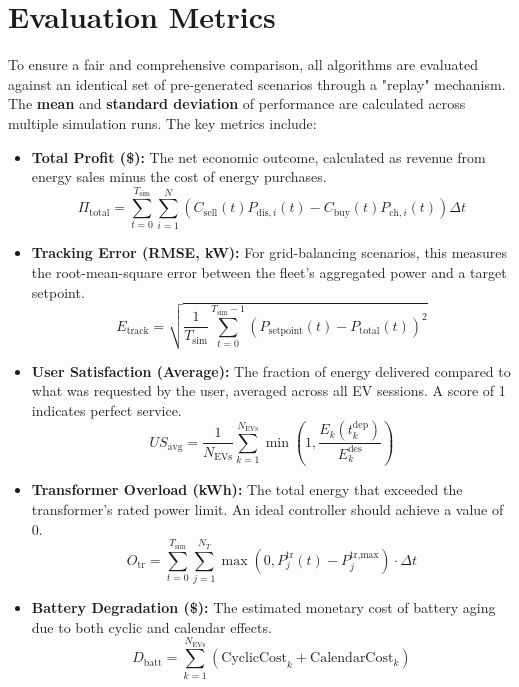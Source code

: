 \section{Evaluation Metrics}
To ensure a fair and comprehensive comparison, all algorithms are evaluated against an identical set of pre-generated scenarios through a "replay" mechanism. The \textbf{mean} and \textbf{standard deviation} of performance are calculated across multiple simulation runs. The key metrics include:

\begin{itemize}
    \item \textbf{Total Profit (\$):} The net economic outcome, calculated as revenue from energy sales minus the cost of energy purchases.
    \[
    \Pi_{\text{total}} = \sum_{t=0}^{T_{\text{sim}}} \sum_{i=1}^{N} \left( C_{\text{sell}}(t) P_{\text{dis},i}(t) - C_{\text{buy}}(t) P_{\text{ch},i}(t) \right) \Delta t
    \]
    
    \item \textbf{Tracking Error (RMSE, kW):} For grid-balancing scenarios, this measures the root-mean-square error between the fleet's aggregated power and a target setpoint.
    \[
    E_{\text{track}} = \sqrt{\frac{1}{T_{\text{sim}}} \sum_{t=0}^{T_{\text{sim}}-1} \left( P_{\text{setpoint}}(t) - P_{\text{total}}(t) \right)^2}
    \]
    
    \item \textbf{User Satisfaction (Average):} The fraction of energy delivered compared to what was requested by the user, averaged across all EV sessions. A score of 1 indicates perfect service.
    \[
    US_{\text{avg}} = \frac{1}{N_{\text{EVs}}} \sum_{k=1}^{N_{\text{EVs}}} \min \left(1, \frac{E_k(t_k^{\text{dep}})}{E_k^{\text{des}}} \right)
    \]
    
    \item \textbf{Transformer Overload (kWh):} The total energy that exceeded the transformer's rated power limit. An ideal controller should achieve a value of 0.
    \[
    O_{\text{tr}} = \sum_{t=0}^{T_{\text{sim}}} \sum_{j=1}^{N_T} \max(0, P_j^{\text{tr}}(t) - P_j^{\text{tr,max}}) \cdot \Delta t
    \]
    
    \item \textbf{Battery Degradation (\$):} The estimated monetary cost of battery aging due to both cyclic and calendar effects.
    \[
    D_{\text{batt}} = \sum_{k=1}^{N_{\text{EVs}}} (\text{CyclicCost}_k + \text{CalendarCost}_k)
    \]
\end{itemize}

